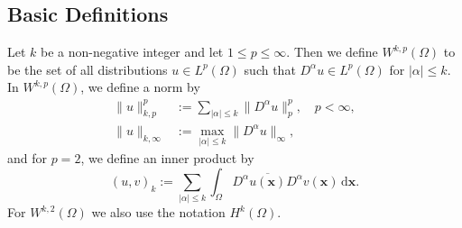 \subsection{Basic Definitions}\label{sec:sobolev-basic-definitions}

\begin{Definition}
\label{def:sobolev-positive-integer-spaces}
Let $k$ be a non-negative integer and let $1\leq p\leq\infty$. Then we define $W^{k,p}(\Omega)$ to be the set of all distributions $u\in L^p(\Omega)$ such that $D^\alpha u\in L^p(\Omega)$ for $|\alpha|\leq k$. In $W^{k,p}(\Omega)$, we define a norm by
\begin{equation}\label{eq:sobolev-positive-integer-norm-definition}
\begin{aligned}
\|u\|_{k,p}^p&:=\sum_{|\alpha|\leq k}\|D^\alpha u\|_p^p,\quad p<\infty,\\
\|u\|_{k,\infty}&:=\max_{|\alpha|\leq k}\|D^\alpha u\|_{\infty},
\end{aligned}
\end{equation}
and for $p=2$, we define an inner product by
\begin{equation}\label{eq:sobolev-hilbert-inner-product-definition}
(u,v)_k:=\sum_{|\alpha|\leq k}\int_{\Omega}D^\alpha\overline{u(\bm{x})}D^\alpha v(\bm{x})\,\mathrm{d}\bm{x}.
\end{equation}
For $W^{k,2}(\Omega)$ we also use the notation $H^k(\Omega)$.
\end{Definition}
